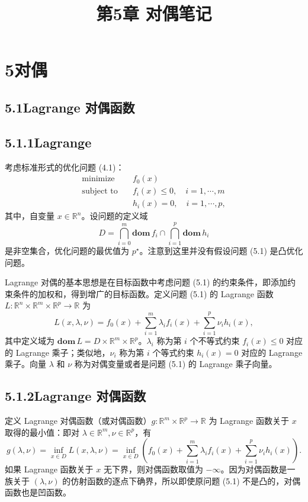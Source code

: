 \documentclass[UTF8,12pt,a4paper,fontset=fandol]{ctexart}
\title{第5章 对偶笔记}
\author{}
\date{}
\begin{document}
\maketitle

\section*{5\quad 对偶}

\subsection*{5.1\quad Lagrange 对偶函数}

\subsection*{5.1.1\quad Lagrange}

考虑标准形式的优化问题 (4.1)：
\begin{equation}
\begin{aligned}
\text{minimize}\quad & f_0(x)\\
\text{subject to}\quad & f_i(x)\leq 0,\quad i=1,\cdots,m\\
& h_i(x)=0,\quad i=1,\cdots,p,
\end{aligned}
\tag{5.1}
\end{equation}
其中，自变量 $x\in\mathbb{R}^n$。设问题的定义域
\[
D=\bigcap_{i=0}^m \mathbf{dom}\,f_i\cap \bigcap_{i=1}^p \mathbf{dom}\,h_i
\]
是非空集合，优化问题的最优值为 $p^\star$。注意到这里并没有假设问题 (5.1) 是凸优化问题。

Lagrange 对偶的基本思想是在目标函数中考虑问题 (5.1) 的约束条件，即添加约束条件的加权和，得到增广的目标函数。定义问题 (5.1) 的 Lagrange 函数 $L:\mathbb{R}^n\times\mathbb{R}^m\times\mathbb{R}^p\to\mathbb{R}$ 为
\[
L(x,\lambda,\nu)=f_0(x)+\sum_{i=1}^m \lambda_i f_i(x)+\sum_{i=1}^p \nu_i h_i(x),
\]
其中定义域为 $\mathbf{dom}\,L=D\times\mathbb{R}^m\times\mathbb{R}^p$。$\lambda_i$ 称为第 $i$ 个不等式约束 $f_i(x)\leq 0$ 对应的 Lagrange 乘子；类似地，$\nu_i$ 称为第 $i$ 个等式约束 $h_i(x)=0$ 对应的 Lagrange 乘子。向量 $\lambda$ 和 $\nu$ 称为对偶变量或者是问题 (5.1) 的 Lagrange 乘子向量。

\subsection*{5.1.2\quad Lagrange 对偶函数}

定义 Lagrange 对偶函数（或对偶函数）$g:\mathbb{R}^m\times\mathbb{R}^p\to\mathbb{R}$ 为 Lagrange 函数关于 $x$ 取得的最小值：即对 $\lambda\in\mathbb{R}^m,\nu\in\mathbb{R}^p$，有
\[
g(\lambda,\nu)=\inf_{x\in D} L(x,\lambda,\nu)
=\inf_{x\in D}\left(f_0(x)+\sum_{i=1}^m \lambda_i f_i(x)+\sum_{i=1}^p \nu_i h_i(x)\right).
\]
如果 Lagrange 函数关于 $x$ 无下界，则对偶函数取值为 $-\infty$。因为对偶函数是一族关于 $(\lambda,\nu)$ 的仿射函数的逐点下确界，所以即使原问题 (5.1) 不是凸的，对偶函数也是凹函数。
\end{document}
